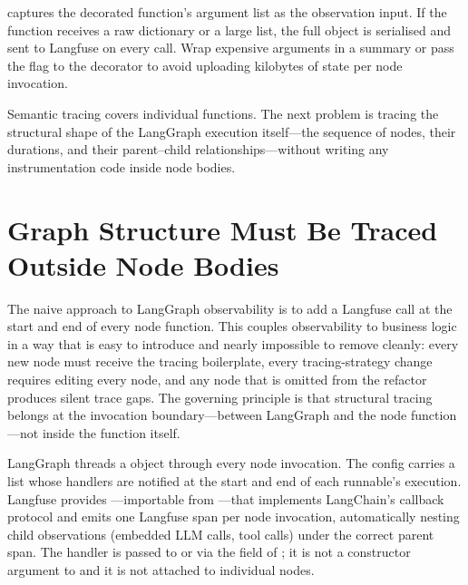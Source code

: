 \begin{warningbox}
 captures the decorated function's argument list as the
observation input. If the function receives a raw 
dictionary or a large  list, the full object is
serialised and sent to Langfuse on every call. Wrap expensive arguments
in a summary or pass the  flag to the
decorator to avoid uploading kilobytes of state per node invocation.
\end{warningbox}

Semantic tracing covers individual functions. The next problem is
tracing the structural shape of the LangGraph execution itself---the
sequence of nodes, their durations, and their parent--child
relationships---without writing any instrumentation code inside node
bodies.


\section{Graph Structure Must Be Traced Outside Node Bodies}
\label{sec:obs-graph-tracing}

The naive approach to LangGraph observability is to add a Langfuse call
at the start and end of every node function. This couples observability
to business logic in a way that is easy to introduce and nearly
impossible to remove cleanly: every new node must receive the tracing
boilerplate, every tracing-strategy change requires editing every node,
and any node that is omitted from the refactor produces silent trace
gaps. The governing principle is that structural tracing belongs at the
invocation boundary---between LangGraph and the node function---not
inside the function itself.

LangGraph threads a  object through every node
invocation. The config carries a  list whose handlers
are notified at the start and end of each runnable's execution.
Langfuse provides ---importable from
---that implements LangChain's callback
protocol and emits one Langfuse span per node invocation,
automatically nesting child observations (embedded LLM calls, tool
calls) under the correct parent span. The handler is passed to
 or  via the 
field of ; it is not a constructor argument to
 and it is not attached to individual nodes.

